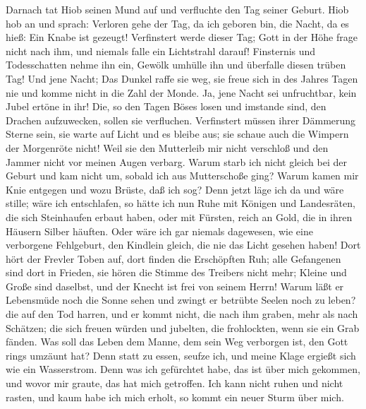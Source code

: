  Darnach tat Hiob seinen Mund auf und verfluchte den Tag
seiner Geburt.  Hiob hob an und sprach: 
Verloren gehe der Tag, da ich geboren bin, die Nacht, da es hieß: Ein
Knabe ist gezeugt!  Verfinstert werde dieser Tag; Gott in
der Höhe frage nicht nach ihm, und niemals falle ein Lichtstrahl darauf!
 Finsternis und Todesschatten nehme ihn ein, Gewölk
umhülle ihn und überfalle diesen trüben Tag!  Und jene
Nacht; Das Dunkel raffe sie weg, sie freue sich in des Jahres Tagen nie
und komme nicht in die Zahl der Monde.  Ja, jene Nacht sei
unfruchtbar, kein Jubel ertöne in ihr!  Die, so den Tagen
Böses losen und imstande sind, den Drachen aufzuwecken, sollen sie
verfluchen.  Verfinstert müssen ihrer Dämmerung Sterne
sein, sie warte auf Licht und es bleibe aus; sie schaue auch die Wimpern
der Morgenröte nicht!  Weil sie den Mutterleib mir nicht
verschloß und den Jammer nicht vor meinen Augen verbarg. 
Warum starb ich nicht gleich bei der Geburt und kam nicht um, sobald ich
aus Mutterschoße ging?  Warum kamen mir Knie entgegen und
wozu Brüste, daß ich sog?  Denn jetzt läge ich da und
wäre stille; wäre ich entschlafen, so hätte ich nun Ruhe 
mit Königen und Landesräten, die sich Steinhaufen erbaut haben,
 oder mit Fürsten, reich an Gold, die in ihren Häusern
Silber häuften.  Oder wäre ich gar niemals dagewesen, wie
eine verborgene Fehlgeburt, den Kindlein gleich, die nie das Licht
gesehen haben!  Dort hört der Frevler Toben auf, dort
finden die Erschöpften Ruh;  alle Gefangenen sind dort in
Frieden, sie hören die Stimme des Treibers nicht mehr; 
Kleine und Große sind daselbst, und der Knecht ist frei von seinem
Herrn!  Warum läßt er Lebensmüde noch die Sonne sehen und
zwingt er betrübte Seelen noch zu leben?  die auf den Tod
harren, und er kommt nicht, die nach ihm graben, mehr als nach Schätzen;
 die sich freuen würden und jubelten, die frohlockten,
wenn sie ein Grab fänden.  Was soll das Leben dem Manne,
dem sein Weg verborgen ist, den Gott rings umzäunt hat? 
Denn statt zu essen, seufze ich, und meine Klage ergießt sich wie ein
Wasserstrom.  Denn was ich gefürchtet habe, das ist über
mich gekommen, und wovor mir graute, das hat mich getroffen.
 Ich kann nicht ruhen und nicht rasten, und kaum habe ich
mich erholt, so kommt ein neuer Sturm über mich.

